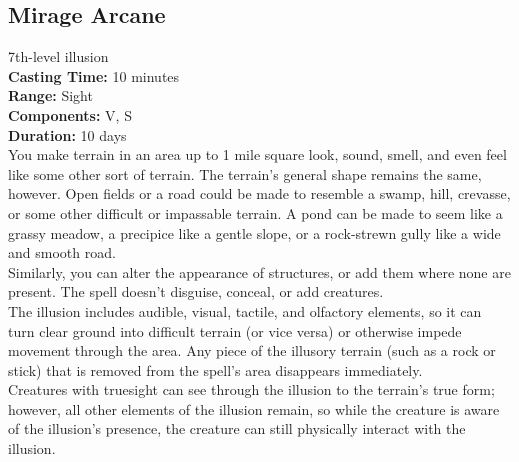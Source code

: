 \documentclass[11pt, A4paper, english]{article}
\begin{document}
		\subsection{Mirage Arcane}
7th-level illusion \\
\textbf{Casting Time:} 10 minutes \\
\textbf{Range:} Sight \\
\textbf{Components:} V, S \\
\textbf{Duration:} 10 days \\
You make terrain in an area up to 1 mile square look, sound, smell, and even feel like some other sort of terrain. The terrain’s general shape remains the same, however. Open fields or a road could be made to resemble a swamp, hill, crevasse, or some other difficult or impassable terrain. A pond can be made to seem  like a grassy meadow, a precipice like a gentle slope, or a rock-strewn gully like a wide and smooth road. \\
Similarly, you can alter the appearance of structures, or add them where none are present. The spell doesn’t disguise, conceal, or add creatures. \\
The illusion includes audible, visual, tactile, and olfactory elements, so it can turn clear ground into difficult terrain (or vice versa) or otherwise impede movement through the area. Any piece of the illusory terrain (such as a rock or stick) that is removed from the spell’s area disappears immediately. \\
Creatures with truesight can see through the illusion to the terrain’s true form; however, all other elements of the illusion remain, so while the creature is aware of the illusion’s presence, the creature can still physically interact with the illusion.
\end{document}
